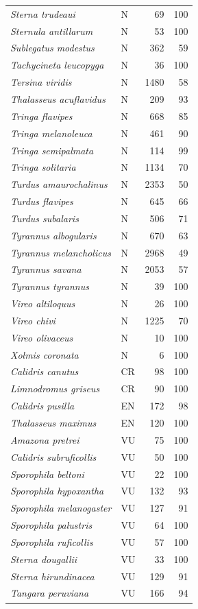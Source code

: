 \documentclass[
  oneside]{scrbook}
\begin{document}
\begin{longtable}[t]{>{}llrr}
\em{Sterna trudeaui} & N & 69 & 100\\
\em{Sternula antillarum} & N & 53 & 100\\
\em{Sublegatus modestus} & N & 362 & 59\\
\em{Tachycineta leucopyga} & N & 36 & 100\\
\addlinespace
\em{Tersina viridis} & N & 1480 & 58\\
\em{Thalasseus acuflavidus} & N & 209 & 93\\
\em{Tringa flavipes} & N & 668 & 85\\
\em{Tringa melanoleuca} & N & 461 & 90\\
\em{Tringa semipalmata} & N & 114 & 99\\
\addlinespace
\em{Tringa solitaria} & N & 1134 & 70\\
\em{Turdus amaurochalinus} & N & 2353 & 50\\
\em{Turdus flavipes} & N & 645 & 66\\
\em{Turdus subalaris} & N & 506 & 71\\
\em{Tyrannus albogularis} & N & 670 & 63\\
\addlinespace
\em{Tyrannus melancholicus} & N & 2968 & 49\\
\em{Tyrannus savana} & N & 2053 & 57\\
\em{Tyrannus tyrannus} & N & 39 & 100\\
\em{Vireo altiloquus} & N & 26 & 100\\
\em{Vireo chivi} & N & 1225 & 70\\
\addlinespace
\em{Vireo olivaceus} & N & 10 & 100\\
\em{Xolmis coronata} & N & 6 & 100\\
\em{Calidris canutus} & CR & 98 & 100\\
\em{Limnodromus griseus} & CR & 90 & 100\\
\em{Calidris pusilla} & EN & 172 & 98\\
\addlinespace
\em{Thalasseus maximus} & EN & 120 & 100\\
\em{Amazona pretrei} & VU & 75 & 100\\
\em{Calidris subruficollis} & VU & 50 & 100\\
\em{Sporophila beltoni} & VU & 22 & 100\\
\em{Sporophila hypoxantha} & VU & 132 & 93\\
\addlinespace
\em{Sporophila melanogaster} & VU & 127 & 91\\
\em{Sporophila palustris} & VU & 64 & 100\\
\em{Sporophila ruficollis} & VU & 57 & 100\\
\em{Sterna dougallii} & VU & 33 & 100\\
\em{Sterna hirundinacea} & VU & 129 & 91\\
\addlinespace
\em{Tangara peruviana} & VU & 166 & 94\\
\bottomrule
\end{longtable}
\end{document}
